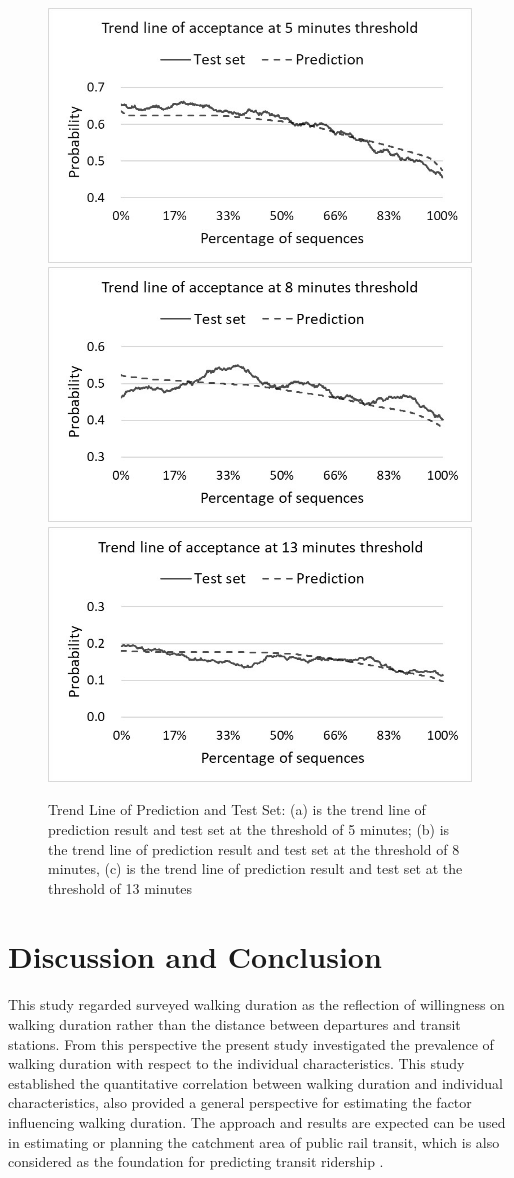 \documentclass[sustainability,article,submit,moreauthors,pdftex,10pt,a4paper]{Definitions/mdpi}
\begin{document}
%
\begin{figure}[h]
	\caption{Trend Line of Prediction and Test Set: (a) is the trend line of prediction result and test set at the threshold of 5 minutes; (b) is the trend line of prediction result and test set at the threshold of 8 minutes, (c) is the trend line of prediction result and test set at the threshold of 13 minutes}
	\label{fig:PredictionTrendLine}
	\centering
	\includegraphics[width=0.5\linewidth]{Prediction5Min}\\
	\includegraphics[width=0.5\linewidth]{Prediction8Min}\\
	\includegraphics[width=0.5\linewidth]{Prediction13Min}\\
\end{figure}

\section{Discussion and Conclusion}
This study regarded surveyed walking duration as the reflection of willingness on walking duration rather than the distance between departures and transit stations. From this perspective the present study investigated the prevalence of walking duration with respect to the individual characteristics. This study established the quantitative correlation between walking duration and individual characteristics, also provided a general perspective for estimating the factor influencing walking duration. The approach and results are expected can be used in estimating or planning the catchment area of public rail transit, which is also considered as the foundation for predicting transit ridership \cite{guerra2013half}.
\end{document}
